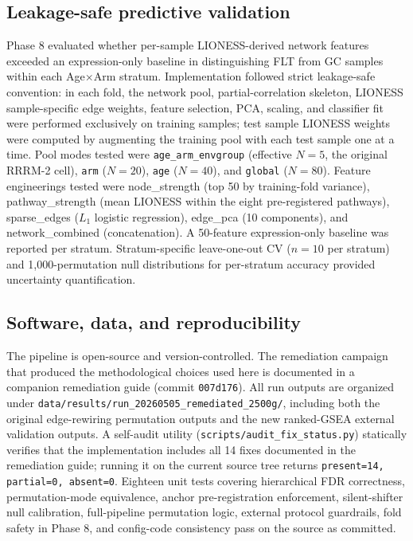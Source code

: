 \documentclass[11pt]{article}
\newcommand{\code}[1]{\texttt{#1}}
\begin{document}
\subsection{Leakage-safe predictive validation}

Phase 8 evaluated whether per-sample LIONESS-derived network features exceeded an expression-only baseline in distinguishing FLT from GC samples within each Age$\times$Arm stratum. Implementation followed strict leakage-safe convention: in each fold, the network pool, partial-correlation skeleton, LIONESS sample-specific edge weights, feature selection, PCA, scaling, and classifier fit were performed exclusively on training samples; test sample LIONESS weights were computed by augmenting the training pool with each test sample one at a time. Pool modes tested were \code{age\_arm\_envgroup} (effective $N{=}5$, the original RRRM-2 cell), \code{arm} ($N{=}20$), \code{age} ($N{=}40$), and \code{global} ($N{=}80$). Feature engineerings tested were node\_strength (top 50 by training-fold variance), pathway\_strength (mean LIONESS within the eight pre-registered pathways), sparse\_edges ($L_1$ logistic regression), edge\_pca (10 components), and network\_combined (concatenation). A 50-feature expression-only baseline was reported per stratum. Stratum-specific leave-one-out CV ($n{=}10$ per stratum) and 1{,}000-permutation null distributions for per-stratum accuracy provided uncertainty quantification.

\subsection{Software, data, and reproducibility}

The pipeline is open-source and version-controlled. The remediation campaign that produced the methodological choices used here is documented in a companion remediation guide (commit \code{007d176}). All run outputs are organized under \code{data/results/run\_20260505\_remediated\_2500g/}, including both the original edge-rewiring permutation outputs and the new ranked-GSEA external validation outputs. A self-audit utility (\code{scripts/audit\_fix\_status.py}) statically verifies that the implementation includes all 14 fixes documented in the remediation guide; running it on the current source tree returns \code{present=14, partial=0, absent=0}. Eighteen unit tests covering hierarchical FDR correctness, permutation-mode equivalence, anchor pre-registration enforcement, silent-shifter null calibration, full-pipeline permutation logic, external protocol guardrails, fold safety in Phase 8, and config-code consistency pass on the source as committed.
\end{document}

